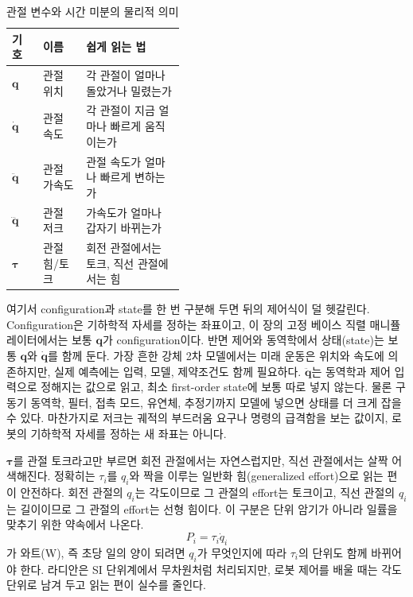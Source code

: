 \begin{table}[!htbp]
  \centering
  \caption{관절 변수와 시간 미분의 물리적 의미}
  \label{tab:joint-variable-derivatives}
  \small
  \renewcommand{\arraystretch}{1.12}
  \begin{tabularx}{\linewidth}{@{}p{0.18\linewidth}p{0.25\linewidth}X@{}}
    \toprule
    기호 & 이름 & 쉽게 읽는 법 \\
    \midrule
    \(\bm{q}\) & 관절 위치 & 각 관절이 얼마나 돌았거나 밀렸는가 \\
    \(\dot{\bm{q}}\) & 관절 속도 & 각 관절이 지금 얼마나 빠르게 움직이는가 \\
    \(\ddot{\bm{q}}\) & 관절 가속도 & 관절 속도가 얼마나 빠르게 변하는가 \\
    \(\dddot{\bm{q}}\) & 관절 저크 & 가속도가 얼마나 갑자기 바뀌는가 \\
    \(\bm{\tau}\) & 관절 힘/토크 & 회전 관절에서는 토크, 직선 관절에서는 힘 \\
    \bottomrule
  \end{tabularx}
\end{table}

여기서 configuration과 state를 한 번 구분해 두면 뒤의 제어식이 덜 헷갈린다.
Configuration은 기하학적 자세를 정하는 좌표이고, 이 장의 고정 베이스 직렬 매니퓰레이터에서는 보통 \(\bm{q}\)가 configuration이다.
%
%
%
반면 제어와 동역학에서 상태(state)는 보통 \(\bm{q}\)와 \(\dot{\bm{q}}\)를 함께 둔다.
%
가장 흔한 강체 2차 모델에서는 미래 운동은 위치와 속도에 의존하지만, 실제 예측에는 입력, 모델, 제약조건도 함께 필요하다.
%
\(\ddot{\bm{q}}\)는 동역학과 제어 입력으로 정해지는 값으로 읽고, 최소 first-order state에 보통 따로 넣지 않는다.
%
%
물론 구동기 동역학, 필터, 접촉 모드, 유연체, 추정기까지 모델에 넣으면 상태를 더 크게 잡을 수 있다.
%
마찬가지로 저크는 궤적의 부드러움 요구나 명령의 급격함을 보는 값이지, 로봇의 기하학적 자세를 정하는 새 좌표는 아니다.
%
%

\(\bm{\tau}\)를 관절 토크라고만 부르면 회전 관절에서는 자연스럽지만, 직선 관절에서는 살짝 어색해진다.
정확히는 \(\tau_i\)를 \(q_i\)와 짝을 이루는 일반화 힘(generalized effort)으로 읽는 편이 안전하다.
회전 관절의 \(q_i\)는 각도이므로 그 관절의 effort는 토크이고, 직선 관절의 \(q_i\)는 길이이므로 그 관절의 effort는 선형 힘이다.
이 구분은 단위 암기가 아니라 일률을 맞추기 위한 약속에서 나온다.
\[
  P_i=\tau_i\dot{q}_i
\]
가 와트(W), 즉 초당 일의 양이 되려면 \(q_i\)가 무엇인지에 따라 \(\tau_i\)의 단위도 함께 바뀌어야 한다.
라디안은 SI 단위계에서 무차원처럼 처리되지만, 로봇 제어를 배울 때는 각도 단위로 남겨 두고 읽는 편이 실수를 줄인다.

